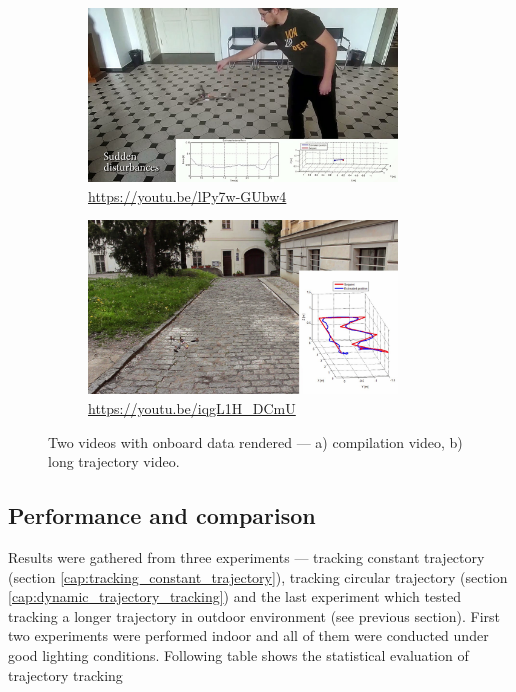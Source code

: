 \begin{figure}[H]
\centering

\begin{subfigure}[b]{0.5\textwidth}
	\centering
	\includegraphics[width=0.9\textwidth]{fig/experiment1_video.jpg}
	\caption{\url{https://youtu.be/lPy7w-GUbw4}}
	\label{fig:video1}
\end{subfigure}%
\begin{subfigure}[b]{0.5\textwidth}
	\centering
	\includegraphics[width=0.9\textwidth]{fig/experiment2_video.jpg}
	\caption{\url{https://youtu.be/iqgL1H_DCmU}}
	\label{fig:video2}
\end{subfigure}

\caption{Two videos with onboard data rendered --- a) compilation video, b) long trajectory video.}
\label{fig:videos}
\end{figure}

\subsection{Performance and comparison}

Results were gathered from three experiments --- tracking constant trajectory (section \ref{cap:tracking_constant_trajectory}), tracking circular trajectory (section \ref{cap:dynamic_trajectory_tracking}) and the last experiment which tested tracking a longer trajectory in outdoor environment (see previous section). First two experiments were performed indoor and all of them were conducted under good lighting conditions.  Following table shows the statistical evaluation of trajectory tracking

